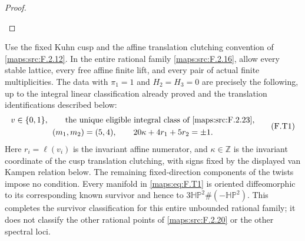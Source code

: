 \begin{proof}
\begin{enumerate}[label=\arabic*.]
\end{enumerate}
\end{proof}




\begin{theorem}\label{maps:src:F.2.24}


Use the fixed Kuhn cusp and the affine translation clutching
convention of \ref{maps:src:F.2.12}.  In the entire rational family \ref{maps:src:F.2.16},
allow every stable lattice, every free affine finite lift,
and every pair of actual finite multiplicities.
The data with $\pi_1=1$ and $H_2=H_3=0$ are precisely the
following, up to the integral linear classification already
proved and the translation identifications described below:
\[
\begin{gathered}
 v\in\{0,1\},\qquad
 \text{the unique eligible integral class of \ref{maps:src:F.2.23}},\\
 (m_1,m_2)=(5,4),\qquad
 20\kappa+4r_1+5r_2=\pm1.
\end{gathered}
 \tag{F.T1}\label{maps:eq:F.T1}
\]
Here $r_i=\ell(v_i)$ is the invariant affine numerator, and
$\kappa\in\mathbb Z$ is the invariant coordinate of the
cusp translation clutching, with signs fixed by the displayed
van Kampen relation below.  The remaining fixed-direction
components of the twists impose no condition.
Every manifold in \eqref{maps:eq:F.T1} is oriented diffeomorphic to its
corresponding known survivor and hence to
$3\mathbb{HP}^2\#(-\mathbb{HP}^2)$.
This completes the survivor classification for this entire
unbounded rational family; it does not classify the other
rational points of \ref{maps:src:F.2.20} or the other spectral loci.

\end{theorem}



